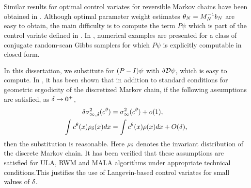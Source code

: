 Similar results for optimal control variates for reversible Markov chains have been obtained in \cite{delkon12}. Although optimal parameter weight estimates $\theta_N = M_N^{-1} b_N$ are easy to obtain, the main difficulty is to compute the term $P\psi$ which is part of the control variate defined in . In \cite{delkon12}, numerical examples are presented for a class of conjugate random-scan Gibbs samplers for which $P\psi$ is explicitly computable in closed form. 

In this dissertation, we substitute for $(P-I)\psi$ with $\delta {\cal D} \psi$, which is easy to compute. In \cite{brodurmeymourad18}, it has been shown that in addition to standard conditions for geometric ergodicity of the discretized Markov chain, if the following assumptions are satisfied, as $\delta \to 0^+$,
\begin{align}
\delta {\sigma^2_\infty}_{,\delta} (c^\theta) &= \sigma^2_\infty(c^\theta) + o(1), \\ 
\int c^\theta(x) \rho_\delta(x) dx & = \int c^\theta(x) \rho(x) dx + O(\delta), 
\end{align}
then the substitution is reasonable. Here $\rho_\delta$ denotes the invariant distribution of the discrete Markov chain. It has been verified that these assumptions are satisfied for ULA, RWM and MALA algorithms under appropriate technical conditions.This justifies the use of Langevin-based control variates for small values of $\delta$. 

